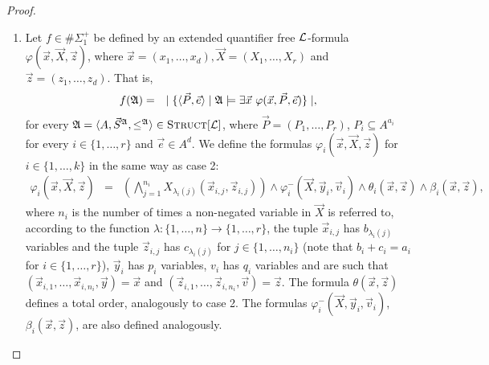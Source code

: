 \documentclass[12pt]{article}
\def\E1{\#\Sigma_1^{+}}
\def\Truc{\textsc{Struct}[\L]}
\def\A{{\frak A}}
\def\L{{\cal L}}
\def\P{\vec{P}}
\def\S{\vec{S}}
\def\X{\vec{X}}
\def\e{\vec{e}} %
\def\v{\vec{v}} %
\def\x{\vec{x}} %
\def\y{\vec{y}} %
\def\z{\vec{z}} %
\begin{document}
\begin{proof}
\begin{enumerate}

\item Let $f \in \E1$ be defined by an extended quantifier free $\L$-formula $\varphi(\x,\X,\z)$, where $\x = (x_1,\dots,x_d), \X = (X_1,\dots,X_r)$ and $\z = (z_1,\dots,z_d)$. That is,
\begin{eqnarray*}
f(\A) &=& \mid \{ \langle\P,\e\rangle \mid \A \models \exists \x \ \varphi(\x,\P,\e) \} \mid,
\end{eqnarray*}
for every $\A = \langle A, \S^{\A}, \leq^{\A} \rangle \in \Truc$, where $\P = (P_1,\ldots,P_r)$, $P_i \subseteq A^{a_i}$ for every $i \in \{1,\ldots,r\}$ and $\e \in A^d$. We define the formulas $\varphi_i(\x,\X,\z)$ for $i\in\{1,\ldots,k\}$ in the same way as case 2:
\begin{eqnarray*}
\varphi_i(\x,\X,\z) &=& \left( \bigwedge_{j=1}^{n_i} X_{\lambda_i(j)}(\x_{i,j},\z_{i,j}) \right) \wedge \varphi^{-}_i(\X,\y_i,\v_i) \wedge \theta_i(\x,\z) \wedge \beta_i(\x,\z),
\end{eqnarray*}
where $n_i$ is the number of times a non-negated variable in $\X$ is referred to, according to the function $\lambda:\{1,\ldots,n\}\to\{1,\ldots,r\}$, the tuple $\x_{i,j}$ has $b_{\lambda_i(j)}$ variables and the tuple $\z_{i,j}$ has $c_{\lambda_i(j)}$ for $j\in\{1,\ldots,n_i\}$ (note that $b_i + c_i = a_i$ for $i\in\{1,\ldots,r\}$), $\y_i$ has $p_i$ variables, $v_i$ has $q_i$ variables and are such that $(\x_{i,1},\ldots,\x_{i,n_i},\y) = \x$ and $(\z_{i,1},\ldots,\z_{i,n_i},\v) = \z.$ The formula $\theta(\x,\z)$ defines a total order, analogously to case 2. The formulas $\varphi^{-}_i(\X,\y_i,\v_i)$, $\beta_i(\x,\z)$, are also defined analogously.
  
\end{enumerate}
\end{proof}
\end{document}
